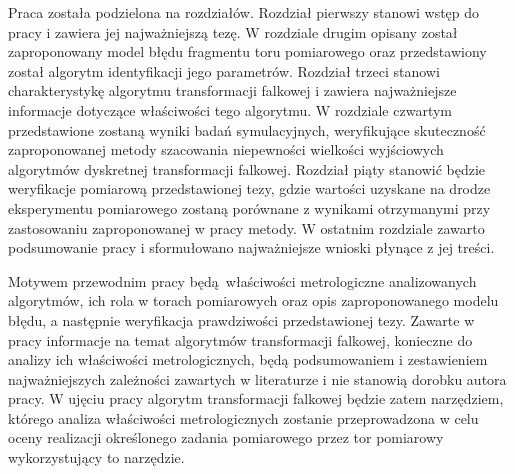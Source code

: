 Praca została podzielona na  rozdziałów. Rozdział pierwszy stanowi wstęp do pracy i zawiera jej najważniejszą tezę. W rozdziale drugim opisany został zaproponowany model błędu fragmentu toru pomiarowego oraz przedstawiony został algorytm identyfikacji jego parametrów. Rozdział trzeci stanowi charakterystykę algorytmu transformacji falkowej i zawiera najważniejsze informacje dotyczące właściwości tego algorytmu. W rozdziale czwartym przedstawione zostaną wyniki badań symulacyjnych, weryfikujące skuteczność zaproponowanej metody szacowania niepewności wielkości wyjściowych algorytmów dyskretnej transformacji falkowej. Rozdział piąty stanowić będzie weryfikacje pomiarową przedstawionej tezy, gdzie wartości uzyskane na drodze eksperymentu pomiarowego zostaną porównane z wynikami otrzymanymi przy zastosowaniu zaproponowanej w pracy metody. W ostatnim rozdziale zawarto podsumowanie pracy i sformułowano najważniejsze wnioski płynące z jej treści.

Motywem przewodnim pracy będą właściwości metrologiczne analizowanych algorytmów, ich rola w torach pomiarowych oraz opis zaproponowanego modelu błędu, a następnie weryfikacja prawdziwości przedstawionej tezy. Zawarte w pracy informacje na temat algorytmów transformacji falkowej, konieczne do analizy ich właściwości metrologicznych, będą podsumowaniem i zestawieniem najważniejszych zależności zawartych w literaturze i nie stanowią dorobku autora pracy. W ujęciu pracy algorytm transformacji falkowej będzie zatem narzędziem, którego analiza właściwości metrologicznych zostanie przeprowadzona w celu oceny realizacji określonego zadania pomiarowego przez tor pomiarowy wykorzystujący to narzędzie.
